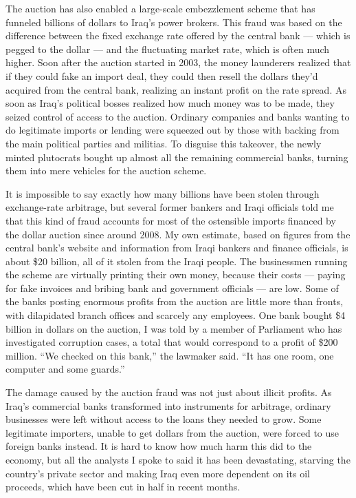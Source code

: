 The auction has also enabled a large-scale embezzlement scheme that has
funneled billions of dollars to Iraq's power brokers. This fraud was
based on the difference between the fixed exchange rate offered by the
central bank --- which is pegged to the dollar --- and the fluctuating
market rate, which is often much higher. Soon after the auction started
in 2003, the money launderers realized that if they could fake an import
deal, they could then resell the dollars they'd acquired from the
central bank, realizing an instant profit on the rate spread. As soon as
Iraq's political bosses realized how much money was to be made, they
seized control of access to the auction. Ordinary companies and banks
wanting to do legitimate imports or lending were squeezed out by those
with backing from the main political parties and militias. To disguise
this takeover, the newly minted plutocrats bought up almost all the
remaining commercial banks, turning them into mere vehicles for the
auction scheme.

It is impossible to say exactly how many billions have been stolen
through exchange-rate arbitrage, but several former bankers and Iraqi
officials told me that this kind of fraud accounts for most of the
ostensible imports financed by the dollar auction since around 2008. My
own estimate, based on figures from the central bank's website and
information from Iraqi bankers and finance officials, is about \$20
billion, all of it stolen from the Iraqi people. The businessmen running
the scheme are virtually printing their own money, because their costs
--- paying for fake invoices and bribing bank and government officials
--- are low. Some of the banks posting enormous profits from the auction
are little more than fronts, with dilapidated branch offices and
scarcely any employees. One bank bought \$4 billion in dollars on the
auction, I was told by a member of Parliament who has investigated
corruption cases, a total that would correspond to a profit of \$200
million. ``We checked on this bank,'' the lawmaker said. ``It has one
room, one computer and some guards.''

The damage caused by the auction fraud was not just about illicit
profits. As Iraq's commercial banks transformed into instruments for
arbitrage, ordinary businesses were left without access to the loans
they needed to grow. Some legitimate importers, unable to get dollars
from the auction, were forced to use foreign banks instead. It is hard
to know how much harm this did to the economy, but all the analysts I
spoke to said it has been devastating, starving the country's private
sector and making Iraq even more dependent on its oil proceeds, which
have been cut in half in recent months.


